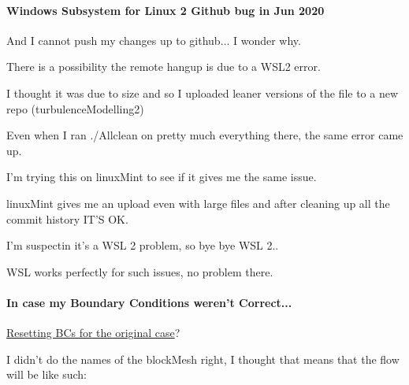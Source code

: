 \documentclass[12pt]{article}
\renewcommand{\_}{\kern-1.5pt\textunderscore\kern-1.5pt}
\begin{document}

\par

\paragraph{Windows Subsystem for Linux 2 Github bug in Jun 2020}

And I cannot push my changes up to github$ \ldots $  I wonder why.\par

There is a possibility the remote hangup is due to a WSL2 error.\par

I thought it was due to size and so I uploaded leaner versions of the file to a new repo (turbulenceModelling2)\par

Even when I ran ./Allclean on pretty much everything there, the same error came up.\par

I’m trying this on linuxMint to see if it gives me the same issue.\par

linuxMint gives me an upload even with large files and after cleaning up all the commit history IT’S OK.\par

I’m suspectin it’s a WSL 2 problem, so bye bye WSL 2..\par


\vspace{\baselineskip}
WSL works perfectly for such issues, no problem there.\par
\paragraph{In case my Boundary Conditions weren't Correct...}
\uline{Resetting BCs for the original case}?\par

I didn’t do the names of the blockMesh right, I thought that means that the flow will be like such:\par



\end{document}
